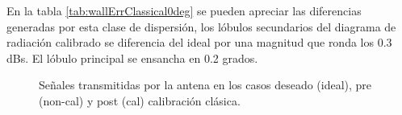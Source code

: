 En la tabla \ref{tab:wallErrClassical0deg} se pueden apreciar las diferencias generadas por esta clase de dispersión, los 
lóbulos secundarios del diagrama de radiación calibrado se diferencia del ideal por una magnitud que ronda los 0.3 dBs. El 
lóbulo principal se ensancha en 0.2 grados.

\begin{figure}[H]
	\centering

	\caption{Señales transmitidas por la antena en los casos deseado (ideal), pre (non-cal) y post (cal) calibración clásica.}
	\label{fig:wallErrClassical0deg}
\end{figure}

